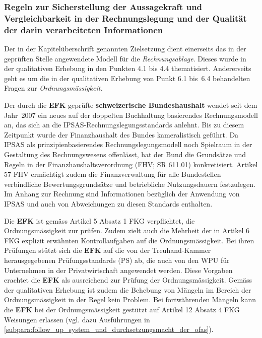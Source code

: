 \documentclass[10pt]{article}
\begin{document}
\subsubsection{Regeln zur Sicherstellung der Aussagekraft und Vergleichbarkeit in der Rechnungslegung und der Qualität der darin verarbeiteten Informationen}\label{subsubsec:regeln_zur_sicherstellung_der_aussagekraft_und_vergleichbarkeit_in_der_rechnungslegung_und_der_qualitaet_der_darin_verarbeiteten_informationen}
Der in der Kapitelüberschrift genannten Zielsetzung dient einerseits das in der geprüften Stelle angewendete Modell für die \textit{Rechnungsablage}. Dieses wurde in der qualitativen Erhebung in den Punkten 4.1 bis 4.4 thematisiert. Andererseits geht es um die in der qualitativen Erhebung von Punkt 6.1 bis~6.4 behandelten Fragen zur \textit{Ordnungsmässigkeit.}

Der durch die \textbf{EFK} geprüfte \textbf{schweizerische Bundeshaushalt} wendet seit dem Jahr~2007 ein neues auf der doppelten Buchhaltung basierendes Rechnungsmodell an, das sich an die IPSAS-Rechnungslegungsstandards anlehnt. Bis zu diesem Zeitpunkt wurde der Finanzhaushalt des Bundes kameralistisch geführt. Da IPSAS als prinzipienbasierendes Rechnungs­legungsmodell noch Spielraum in der Gestaltung des Rechnungswesens offenlässt, hat der Bund die Grundsätze und Regeln in der Finanzhaushaltsverordnung (FHV; SR 611.01) konkretisiert. Artikel 57 FHV ermächtigt zudem die Finanzverwaltung für alle Bundestellen verbindliche Bewertungsgrundsätze und betriebliche Nutzungsdauern festzulegen. Im Anhang zur Rechnung sind Informationen bezüglich der Anwendung von IPSAS und auch von Abweichungen zu diesen Standards enthalten.

Die \textbf{EFK }ist gemäss Artikel 5 Absatz 1 FKG verpflichtet, die Ordnungsmässigkeit zur prüfen. Zudem zielt auch die Mehrheit der in Artikel 6 FKG explizit erwähnten Kontrollaufgaben auf die Ordnungsmässigkeit. Bei ihren Prüfungen stützt sich die \textbf{EFK} auf die von der Treuhand-Kammer herausgegebenen Prüfungsstandards (PS) ab, die auch von den WPU für Unternehmen in der Privatwirtschaft angewendet werden. Diese Vorgaben erachtet die \textbf{EFK} als ausreichend zur Prüfung der Ordnungsmässigkeit. Gemäss der qualitativen Erhebung ist zudem die Behebung von Mängeln im Bereich der Ordnungsmässigkeit in der Regel kein Problem. Bei fortwährenden Mängeln kann die \textbf{EFK} bei der Ordnungsmässigkeit gestützt auf Artikel 12 Absatz 4 FKG Weisungen erlassen (vgl. dazu Ausführungen in \vref{subpara:follow_up_system_und_durchsetzungsmacht_der_ofas}).
\end{document}
